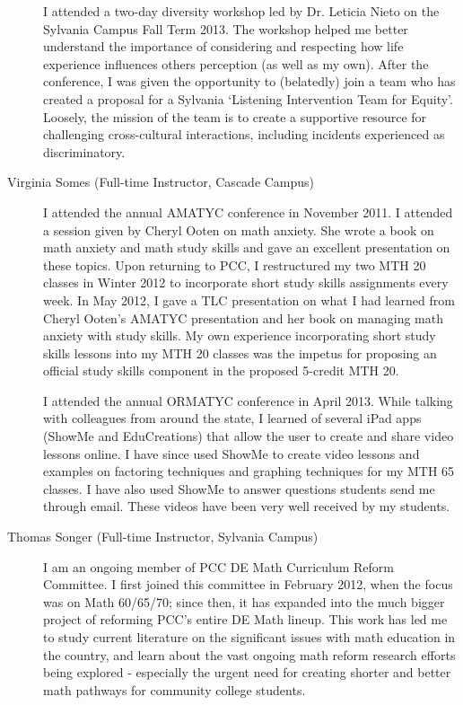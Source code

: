 \begin{description}
	I attended a two-day diversity workshop led by Dr. Leticia Nieto on the
	Sylvania Campus Fall Term 2013.  The workshop helped me better understand the
	importance of considering and respecting how life experience influences others
	perception (as well as my own). After the conference, I was given the
	opportunity to (belatedly) join a team who has created a proposal for a
	Sylvania `Listening Intervention Team for Equity'. Loosely, the mission
	of the team is to create a supportive resource for challenging cross-cultural
	interactions, including incidents experienced as discriminatory.

	\item[Virginia Somes (Full-time Instructor, Cascade Campus)]
	I attended the annual AMATYC conference in November 2011.  I attended a session
	given by Cheryl Ooten on math anxiety.  She wrote a book on math anxiety and
	math study skills and gave an excellent presentation on these topics.  Upon
	returning to PCC, I restructured my two MTH 20 classes in Winter 2012 to
	incorporate short study skills assignments every week.  In May 2012, I gave a
	TLC presentation on what I had learned from Cheryl Ooten's AMATYC
	presentation and her book on managing math anxiety with study skills.  My own
	experience incorporating short study skills lessons into my MTH 20 classes was
	the impetus for proposing an official study skills component in the proposed
	5-credit MTH 20.

	I attended the annual ORMATYC conference in April 2013.  While talking with
	colleagues from around the state, I learned of several iPad apps (ShowMe and
	EduCreations) that allow the user to create and share video lessons online.  I
	have since used ShowMe to create video lessons and examples on factoring
	techniques and graphing techniques for my MTH 65 classes.  I have also used
	ShowMe to answer questions students send me through email.  These videos have
	been very well received by my students.

	\item[Thomas Songer (Full-time Instructor, Sylvania Campus)]
	I am an ongoing member of PCC DE Math Curriculum Reform Committee.  I first
	joined this committee in February 2012, when the focus was on Math 60/65/70;
	since then, it has expanded into the much bigger project of reforming PCC's
	entire DE Math lineup.  This work has led me to study current literature on the
	significant issues with math education in the country, and learn about the vast
	ongoing math reform research efforts being explored - especially the urgent
	need for creating shorter and better math pathways for community college
	students.


\end{description}
